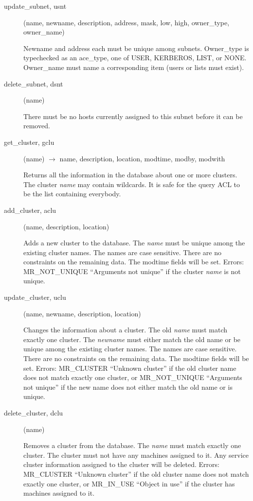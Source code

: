 \begin{description}
\item[update\_subnet, usnt](name, newname, description, address, mask, low, high,
owner\_type, owner\_name)

Newname and address each must be unique among subnets.  Owner\_type
is typechecked as an ace\_type, one of USER, KERBEROS, LIST, or NONE.
Owner\_name must name a corresponding item (users or lists must exist).

\item[delete\_subnet, dsnt](name)

There must be no hosts currently assigned to this subnet
before it can be removed.


\item[get\_cluster, gclu](name) $\rightarrow$ name, description, location,
modtime, modby, modwith

Returns all the information in the database about one or more
clusters.  The cluster {\em name} may contain wildcards.  It is safe for
the query ACL to be the list containing everybody.

\item[add\_cluster, aclu](name, description, location)

Adds a new cluster to the database.  The {\em name} must be unique among
the existing cluster names.  The names are case sensitive.  There are
no constraints on the remaining data.  The modtime fields will be set.
Errors: MR\_NOT\_UNIQUE ``Arguments not unique'' if the cluster {\em name}
is not unique.

\item[update\_cluster, uclu](name, newname, description, location)

Changes the information about a cluster.  The old {\em name} must match
exactly one cluster.  The {\em newname} must either match the old name
or be unique among the existing cluster names.  The names are case
sensitive.  There are no constraints on the remaining data.  The
modtime fields will be set.  Errors: MR\_CLUSTER ``Unknown cluster'' if
the old cluster name does not match exactly one cluster, or
MR\_NOT\_UNIQUE ``Arguments not unique'' if the new name does not either
match the old name or is unique.

\item[delete\_cluster, dclu](name)

Removes a cluster from the database.  The {\em name} must match exactly
one cluster.  The cluster must not have any machines assigned to it.
Any service cluster information assigned to the cluster will be
deleted.  Errors: MR\_CLUSTER ``Unknown cluster'' if the old cluster
name does not match exactly one cluster, or MR\_IN\_USE ``Object in use''
if the cluster has machines assigned to it.


\end{description}
